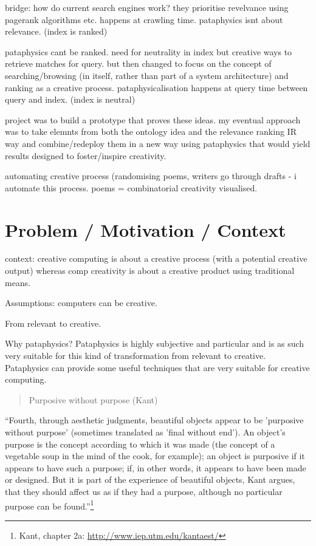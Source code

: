 bridge: how do current search engines work? they prioritise revelvance using pagerank algorithms etc. happens at crawling time. pataphysics isnt about relevance. (index is ranked)

pataphysics cant be ranked. need for neutrality in index but creative ways to retrieve matches for query.
but then changed to focus on the concept of searching/browsing (in itself, rather than part of a system architecture) and ranking as a creative process.
pataphysicalisation happens at query time between query and index. (index is neutral)

project was to build a prototype that proves these ideas.
my eventual approach was to take elemnts from both the ontology idea and the relevance ranking IR way and combine/redeploy them in a new way using pataphysics that would yield results designed to foster/inspire creativity.

automating creative process (randomising poems, writers go through drafts - i automate this process. poems = combinatorial creativity visualised.





\section{Problem / Motivation / Context}

context: creative computing is about a creative process (with a potential creative output) whereas comp creativity is about a creative product using traditional means.

Assumptions: computers can be creative.

From relevant to creative.

Why pataphysics?
Pataphysics is highly subjective and particular and is as such very suitable for this kind of transformation from relevant to creative.
Pataphysics can provide some useful techniques that are very suitable for creative computing.

\begin{quote}
  Purposive without purpose (Kant)
\end{quote}

``Fourth, through aesthetic judgments, beautiful objects appear to be 'purposive without purpose' (sometimes translated as 'final without end'). An object's purpose is the concept according to which it was made (the concept of a vegetable soup in the mind of the cook, for example); an object is purposive if it appears to have such a purpose; if, in other words, it appears to have been made or designed. But it is part of the experience of beautiful objects, Kant argues, that they should affect us as if they had a purpose, although no particular purpose can be found.''\footnote{Kant, chapter 2a: \url{http://www.iep.utm.edu/kantaest/}}

